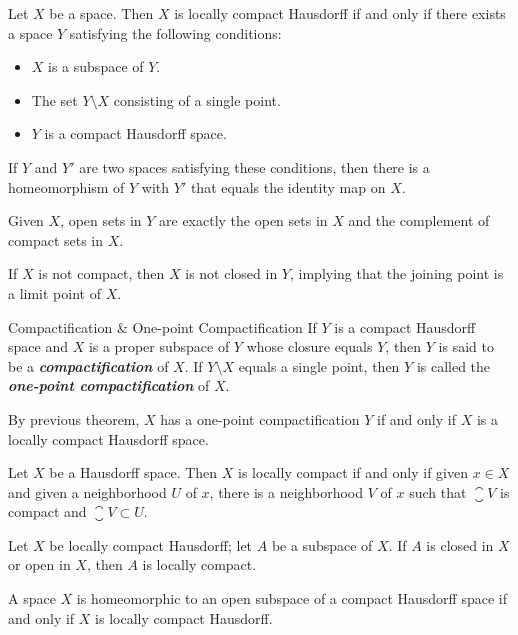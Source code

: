 \documentclass[12pt,a4paper]{article}
\begin{document}
    \begin{thm}
        Let $X$ be a space. Then $X$ is locally compact Hausdorff if and only if there exists a space $Y$ satisfying the following conditions:
        \begin{itemize}
            \item $X$ is a subspace of $Y$.
            \item The set $Y\setminus X$ consisting of a single point.
            \item $Y$ is a compact Hausdorff space.
        \end{itemize}
        If $Y$ and $Y'$ are two spaces satisfying these conditions, then there is a homeomorphism of $Y$ with $Y'$ that equals the identity map on $X$.
    \end{thm}
    \begin{remark}
        Given $X$, open sets in $Y$ are exactly the open sets in $X$ and the complement of compact sets in $X$.
    \end{remark}
    \begin{remark}
        If $X$ is not compact, then $X$ is not closed in $Y$, implying that the joining point is a limit point of $X$.
    \end{remark}
    \hfill

    \begin{defi}{Compactification \& One-point Compactification}
        If $Y$ is a compact Hausdorff space and $X$ is a proper subspace of $Y$ whose closure equals $Y$, then $Y$ is said to be a \textbf{\textit{compactification}} of $X$. If $Y\setminus X$ equals a single point, then $Y$ is called the \textbf{\textit{one-point compactification}} of $X$.
    \end{defi}
    \begin{remark}
        By previous theorem, $X$ has a one-point compactification $Y$ if and only if $X$ is a locally compact Hausdorff space.
    \end{remark}
    \hfill

    \begin{thm}
        Let $X$ be a Hausdorff space. Then $X$ is locally compact if and only if given $x\in X$ and given a neighborhood $U$ of $x$, there is a neighborhood $V$ of $x$ such that $\closure{V}$ is compact and $\closure{V}\subset U$.
    \end{thm}
    \begin{cor}
        Let $X$ be locally compact Hausdorff; let $A$ be a subspace of $X$. If $A$ is closed in $X$ or open in $X$, then $A$ is locally compact.
    \end{cor}
    \begin{cor}
        A space $X$ is homeomorphic to an open subspace of a compact Hausdorff space if and only if $X$ is locally compact Hausdorff.
    \end{cor}
    \hfill
\end{document}
